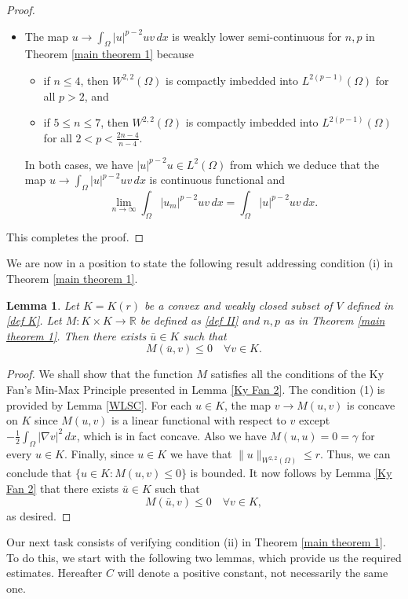 \documentclass[10pt,a4paper]{amsart}
\numberwithin{equation}{section}
\newtheorem{lemma}[theorem]{Lemma}
\begin{document}
\begin{proof}
\begin{itemize}
\item The map \( u\to\int_{\Omega}|u|^{p-2}uv\,dx\) is weakly lower semi-continuous for
\( n,p \) in Theorem \ref{main theorem 1} because
\begin{itemize}
   \item[(i)] if \(n\leq 4\), then  \(W^{2,2}(\Omega)\) is compactly  imbedded into
   \( L^{2(p-1)}(\Omega)\) for all \(  p>2\), and
   \item[(ii)] if \(5\leq n\leq 7\), then \(W^{2,2}(\Omega)\) is compactly imbedded
   into \( L^{2(p-1)}(\Omega)\) for all \( 2<p< \frac{2n-4}{n-4}\).
\end{itemize}
In both cases, we have  $|u|^{p-2}u\in L^2(\Omega) $ from which we deduce that the map
\( u\to\int_{\Omega}|u|^{p-2}uv\,dx\) is continuous functional and
\[
\lim_{n\to \infty}
\int_{\Omega}|u_m|^{p-2}uv\,dx= \int_{\Omega}|u|^{p-2}uv\,dx.
 \]
\end{itemize}
This completes the proof.
\end{proof}

We are now in a position to state the following result addressing condition (i)
in Theorem \ref{main theorem 1}.

\begin{lemma}\label{cond i}
Let \( K=K(r)\) be a convex and weakly closed subset of \(V\) defined in \eqref{def K}.
Let \( M : K \times K \to\mathbb{R}\) be defined as \eqref{def II} and \(n,p\) as in
Theorem \ref{main theorem 1}. Then there exists \(\bar{u} \in K\)    such that
\[M(\bar{u}, v)\leq 0\quad  \forall v\in  K.\]
\end{lemma}

\begin{proof}
 We shall show that the function \(M\) satisfies all the conditions of the Ky Fan's
Min-Max Principle presented in Lemma \ref{Ky Fan 2}.
The condition (1) is provided by Lemma \ref{WLSC}. For
each \(u\in K\), the map \(v \to M(u, v)\) is concave on \(K\) since \(M(u, v)\) is a
linear functional with respect to \(v\) except
\( -\frac{1}{2}\int_{\Omega} |\nabla v|^2\,dx\), which is in fact concave.
 Also we have \( M(u, u) = 0 = \gamma\) for every \(u \in K\). Finally, since
\(u\in K\) we have that \(\rVert u \rVert_{ W^{2,2}(\Omega)}\leq r\).
Thus, we can conclude that
\( \{u \in K : M(u, v) \leq 0\}\) is bounded. It now follows by Lemma \ref{Ky Fan 2}
that there exists \(\bar{u} \in K\) such that
\[
M(\bar{u}, v)\leq 0\quad  \forall v\in  K,
\]
as desired.
\end{proof}

Our next task consists of verifying condition (ii) in Theorem \ref{main theorem 1}.
To do this, we start with the following two lemmas, which provide us the required
estimates.
Hereafter $C$ will denote a positive constant, not necessarily the same one.
\end{document}

